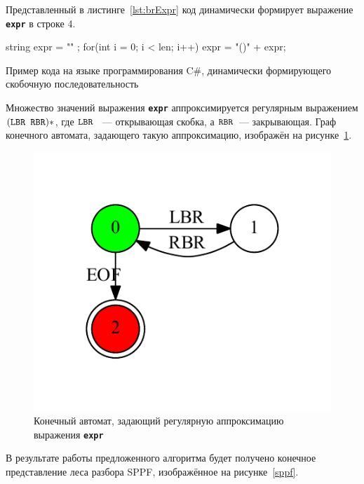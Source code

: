 Представленный в листинге~\ref{lst:brExpr} код динамически формирует выражение \textbf{\texttt{expr}} в строке 4.

\begin{listing}
\begin{pyglist}[language=csharp,numbers=left,numbersep=5pt]
 string expr = "" ;
 for(int i = 0; i < len; i++) 
 {
     expr = "()" + expr;
 }
\end{pyglist}
\caption{Пример кода на языке программирования C\#, динамически формирующего скобочную последовательность}
\label{lst:brExpr}
\end{listing}

Множество значений выражения \textbf{\texttt{expr}} аппроксимируется регулярным выражением $(\mbox{\texttt{LBR }} \mbox{\texttt{RBR}})*$, где $\mbox{\texttt{LBR }}$ --- открывающая скобка, а $\mbox{\texttt{RBR}}$~--- закрывающая. Граф конечного автомата, задающего такую аппроксимацию, изображён на рисунке~\ref{input}.

\begin{figure}[!h]
 \centering
 \includegraphics[]{pics/input.pdf}
 \caption{Конечный автомат, задающий регулярную аппроксимацию выражения \textbf{\texttt{expr}}}
 \label{input}
\end{figure}

В результате работы предложенного алгоритма будет получено конечное представление леса разбора SPPF, изображённое на рисунке~\ref{sppf}.

